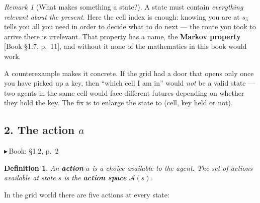 \documentclass[11pt, letterpaper]{article}
\theoremstyle{runin}
\newtheorem*{definition}{Definition}
\theoremstyle{runinplain}
\theoremstyle{remark}
\newtheorem*{remark}{Remark}
\newcommand{\Aspace}{\mathcal{A}}
\newcommand{\bk}[1]{{\color{bookblue}\small$\blacktriangleright$\,\textsf{Book: #1}}}
\newcommand{\bkin}[1]{{\color{bookblue}\small[\textsf{Book #1}]}}
\begin{document}
\begin{remark}[What makes something a state?]
A state must contain \emph{everything relevant about the present}. Here the cell
index is enough: knowing you are at $s_5$ tells you all you need in order to decide
what to do next --- the route you took to arrive there is irrelevant. That property
has a name, the \textbf{Markov property} \bkin{\S1.7, p.~11}, and without it none of
the mathematics in this book would work.

A counterexample makes it concrete. If the grid had a door that opens only once you
have picked up a key, then ``which cell I am in'' would \emph{not} be a valid state
--- two agents in the same cell would face different futures depending on whether
they hold the key. The fix is to enlarge the state to (cell, key held or not).
\end{remark}

\subsection*{2. The action $a$}

\bk{\S1.2, p.~2}

\begin{definition}
An \textbf{action} $a$ is a choice available to the agent. The set of actions
available at state $s$ is the \textbf{action space} $\Aspace(s)$.
\end{definition}

In the grid world there are five actions at every state:

\begin{center}
\end{center}
\end{document}
